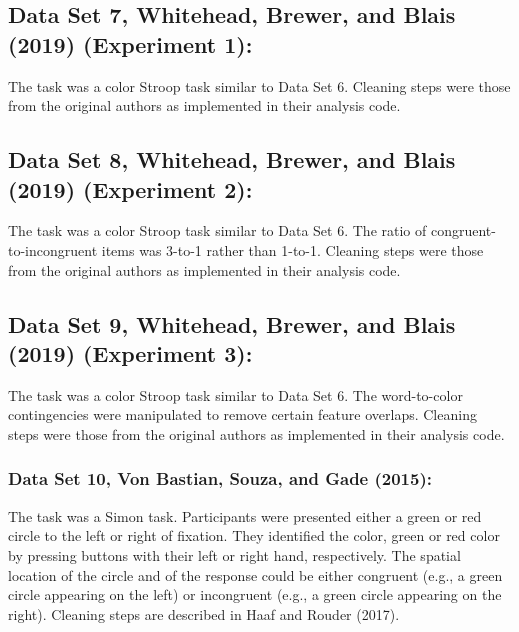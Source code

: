 \documentclass[
  english,
  ,man]{apa6}
\begin{document}
\hypertarget{data-set-7-whitehead.etal.2019-experiment-1}{%
\subsection{Data Set 7, Whitehead, Brewer, and Blais (2019) (Experiment 1):}\label{data-set-7-whitehead.etal.2019-experiment-1}}

The task was a color Stroop task similar to Data Set 6. Cleaning steps were those from the original authors as implemented in their analysis code.

\hypertarget{data-set-8-whitehead.etal.2019-experiment-2}{%
\subsection{Data Set 8, Whitehead, Brewer, and Blais (2019) (Experiment 2):}\label{data-set-8-whitehead.etal.2019-experiment-2}}

The task was a color Stroop task similar to Data Set 6. The ratio of congruent-to-incongruent items was 3-to-1 rather than 1-to-1. Cleaning steps were those from the original authors as implemented in their analysis code.

\hypertarget{data-set-9-whitehead.etal.2019-experiment-3}{%
\subsection{Data Set 9, Whitehead, Brewer, and Blais (2019) (Experiment 3):}\label{data-set-9-whitehead.etal.2019-experiment-3}}

The task was a color Stroop task similar to Data Set 6. The word-to-color contingencies were manipulated to remove certain feature overlaps. Cleaning steps were those from the original authors as implemented in their analysis code.

\hypertarget{data-set-10-vonbastianetal2015}{%
\subsubsection{Data Set 10, Von Bastian, Souza, and Gade (2015):}\label{data-set-10-vonbastianetal2015}}

The task was a Simon task. Participants were presented either a green or red circle to the left or right of fixation. They identified the color, green or red color by pressing buttons with their left or right hand, respectively. The spatial location of the circle and of the response could be either congruent (e.g., a green circle appearing on the left) or incongruent (e.g., a green circle appearing on the right). Cleaning steps are described in Haaf and Rouder (2017).
\end{document}
